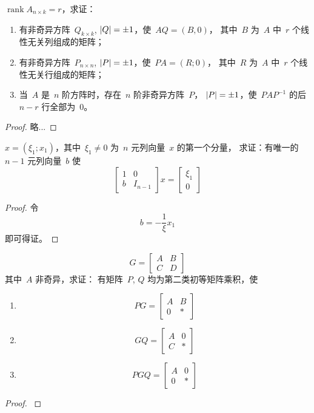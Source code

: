 \documentclass[twoside,openright]{book}
\begin{document}
\begin{CJK*}{UTF8}{}
\begin{quest}
\label{quest:23}
$\operatorname{rank}A_{n\times k}=r$，求证：
\begin{enumerate}
\item
有非奇异方阵\ $Q_{k\times k}$, $\lvert{Q}\rvert=\pm1$，使\ $AQ=(B,0)$，
其中\ $B$ 为\ $A$ 中\ $r$ 个线性无关列组成的矩阵；
\item
有非奇异方阵\ $P_{n\times n}$, $\lvert{P}\rvert=\pm1$，使\ $PA=(R;0)$，
其中\ $R$ 为\ $A$ 中\ $r$ 个线性无关行组成的矩阵；
\item
当\ $A$ 是\ $n$ 阶方阵时，存在\ $n$ 阶非奇异方阵\ $P$，
$\lvert{P}\rvert=\pm1$，使\ $PAP^{-1}$ 的后\ $n-r$ 行全部为\ $0$。
\end{enumerate}
\end{quest}
\begin{proof}
略...
\end{proof}

\begin{quest}[高斯消去法]
\label{quest:24}
$x=(\xi_1;x_1)$，其中\ $\xi_1\neq0$ 为\ $n$ 元列向量\ $x$ 的第一个分量，
求证：有唯一的\ $n-1$ 元列向量\ $b$ 使
\[
\begin{bmatrix}
1 & 0 \\
b & I_{n-1}
\end{bmatrix}
x=
\begin{bmatrix}
\xi_1 \\
0
\end{bmatrix}
\]
\end{quest}
\begin{proof}
令
\[
b=- \frac{1}{\xi} x_1
\]
即可得证。
\end{proof}

\begin{quest}
\label{quest:25}
\[
G=
\begin{bmatrix}
A & B \\
C & D
\end{bmatrix}
\]
其中\ $A$ 非奇异，求证：
有矩阵\ $P$, $Q$ 均为第二类初等矩阵乘积，使
\begin{enumerate}
\item
\[
PG=
\begin{bmatrix}
A & B \\
0 & *
\end{bmatrix}
\]
\item
\[
GQ=
\begin{bmatrix}
A & 0 \\
C & *
\end{bmatrix}
\]
\item
\[
PGQ=
\begin{bmatrix}
A & 0 \\
0 & *
\end{bmatrix}
\]
\end{enumerate}
\end{quest}
\begin{proof}
$ $


\end{proof}
\end{CJK*}
\end{document}
